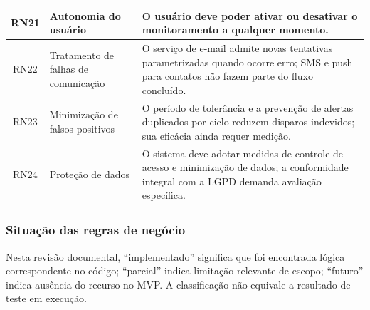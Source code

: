 \begin{table}[H]
\begin{tabular}{|c|p{4cm}|p{8cm}|}
RN21 & Autonomia do usuário &
O usuário deve poder ativar ou desativar o monitoramento a qualquer momento. \\
\hline

RN22 & Tratamento de falhas de comunicação &
O serviço de e-mail admite novas tentativas parametrizadas quando ocorre erro; SMS e push para contatos não fazem parte do fluxo concluído. \\
\hline

RN23 & Minimização de falsos positivos &
O período de tolerância e a prevenção de alertas duplicados por ciclo reduzem disparos indevidos; sua eficácia ainda requer medição. \\
\hline

RN24 & Proteção de dados &
O sistema deve adotar medidas de controle de acesso e minimização de dados; a conformidade integral com a LGPD demanda avaliação específica. \\
\hline

\end{tabular}

\end{table}



\subsubsection{Situação das regras de negócio}

Nesta revisão documental, “implementado” significa que foi encontrada lógica correspondente no código; “parcial” indica limitação relevante de escopo; “futuro” indica ausência do recurso no MVP. A classificação não equivale a resultado de teste em execução.

